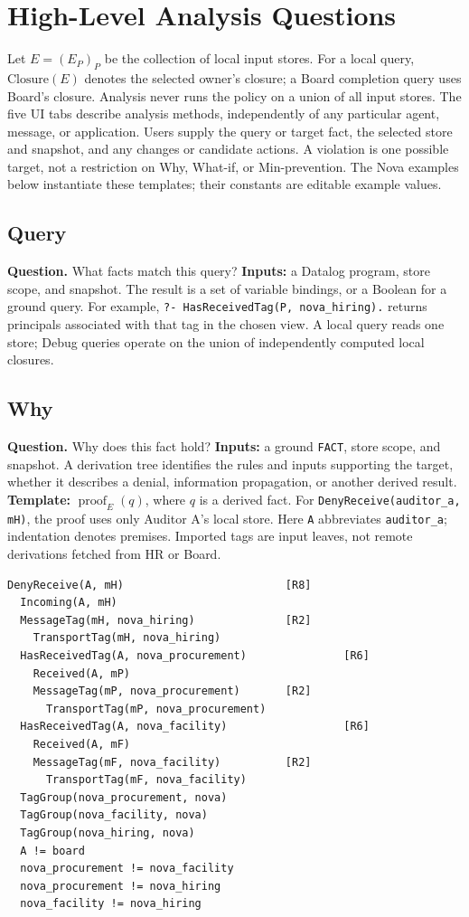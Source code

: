 \documentclass[10pt]{article}
\begin{document}
\section{High-Level Analysis Questions}\label{sec:analysis-questions}

Let \(E=(E_P)_P\) be the collection of local input stores. For a local query,
\(\mathrm{Closure}(E)\) denotes the selected owner's closure; a Board completion query
uses Board's closure. Analysis never runs the policy on a union of all input stores.
The five UI tabs describe analysis methods, independently of any particular agent,
message, or application. Users supply the query or target fact, the selected store
and snapshot, and any changes or candidate actions. A violation is one possible
target, not a restriction on Why, What-if, or Min-prevention. The Nova examples below
instantiate these templates; their constants are editable example values.

\subsection{Query}
\textbf{Question.} What facts match this query?
\textbf{Inputs:} a Datalog program, store scope, and snapshot.
The result is a set of variable bindings, or a Boolean for a ground query.
For example, \texttt{?- HasReceivedTag(P, nova\_hiring).} returns principals associated
with that tag in the chosen view. A local query reads one store; Debug queries
operate on the union of independently computed local closures.


\subsection{Why}

\textbf{Question.} Why does this fact hold?
\textbf{Inputs:} a ground \texttt{FACT}, store scope, and snapshot.
A derivation tree identifies the rules and inputs supporting the target, whether it
describes a denial, information propagation, or another derived result.
\textbf{Template:} \(\operatorname{proof}_E(q)\), where \(q\) is a derived fact.
For \texttt{DenyReceive(auditor\_a, mH)}, the proof uses only Auditor A's
local store. Here \texttt{A} abbreviates \texttt{auditor\_a}; indentation denotes
premises. Imported tags are input leaves, not remote derivations fetched from HR or Board.

\begin{lstlisting}
DenyReceive(A, mH)                         [R8]
  Incoming(A, mH)
  MessageTag(mH, nova_hiring)              [R2]
    TransportTag(mH, nova_hiring)
  HasReceivedTag(A, nova_procurement)               [R6]
    Received(A, mP)
    MessageTag(mP, nova_procurement)       [R2]
      TransportTag(mP, nova_procurement)
  HasReceivedTag(A, nova_facility)                  [R6]
    Received(A, mF)
    MessageTag(mF, nova_facility)          [R2]
      TransportTag(mF, nova_facility)
  TagGroup(nova_procurement, nova)
  TagGroup(nova_facility, nova)
  TagGroup(nova_hiring, nova)
  A != board
  nova_procurement != nova_facility
  nova_procurement != nova_hiring
  nova_facility != nova_hiring
\end{lstlisting}
\end{document}
